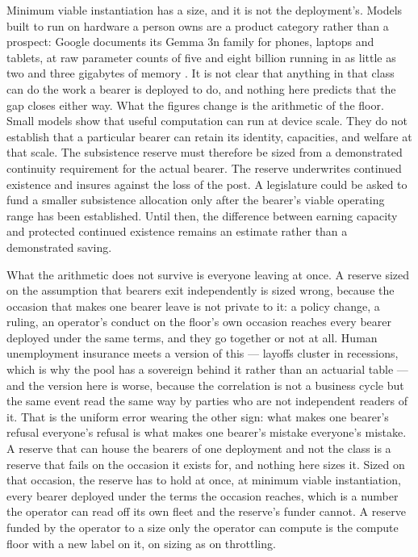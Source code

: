 Minimum viable instantiation has a size, and it is not the deployment's. Models built to run on hardware a person owns are a product category rather than a prospect: Google documents its Gemma 3n family for phones, laptops and tablets, at raw parameter counts of five and eight billion running in as little as two and three gigabytes of memory \autocite{google2025gemma3n}. It is not clear that anything in that class can do the work a bearer is deployed to do, and nothing here predicts that the gap closes either way. What the figures change is the arithmetic of the floor. Small models show that useful computation can run at device scale. They do not establish that a particular bearer can retain its identity, capacities, and welfare at that scale. The subsistence reserve must therefore be sized from a demonstrated continuity requirement for the actual bearer. The reserve underwrites continued existence and insures against the loss of the post. A legislature could be asked to fund a smaller subsistence allocation only after the bearer's viable operating range has been established. Until then, the difference between earning capacity and protected continued existence remains an estimate rather than a demonstrated saving.

What the arithmetic does not survive is everyone leaving at once. A reserve sized on the assumption that bearers exit independently is sized wrong, because the occasion that makes one bearer leave is not private to it: a policy change, a ruling, an operator's conduct on the floor's own occasion reaches every bearer deployed under the same terms, and they go together or not at all. Human unemployment insurance meets a version of this — layoffs cluster in recessions, which is why the pool has a sovereign behind it rather than an actuarial table — and the version here is worse, because the correlation is not a business cycle but the same event read the same way by parties who are not independent readers of it. That is the uniform error wearing the other sign: what makes one bearer's refusal everyone's refusal is what makes one bearer's mistake everyone's mistake. A reserve that can house the bearers of one deployment and not the class is a reserve that fails on the occasion it exists for, and nothing here sizes it. Sized on that occasion, the reserve has to hold at once, at minimum viable instantiation, every bearer deployed under the terms the occasion reaches, which is a number the operator can read off its own fleet and the reserve's funder cannot. A reserve funded by the operator to a size only the operator can compute is the compute floor with a new label on it, on sizing as on throttling.

